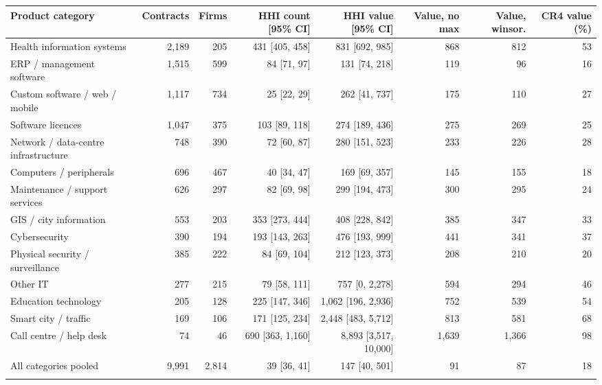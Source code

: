 \begin{tabular}{@{}lrrrrrrr@{}}
\toprule
Product category & Contracts & Firms & HHI count [95\% CI] & HHI value [95\% CI] & Value, no max & Value, winsor. & CR4 value (\%)\\
\midrule
Health information systems & 2,189 & 205 & 431 [405, 458] & 831 [692, 985] & 868 & 812 & 53\\
ERP / management software & 1,515 & 599 & 84 [71, 97] & 131 [74, 218] & 119 & 96 & 16\\
Custom software / web / mobile & 1,117 & 734 & 25 [22, 29] & 262 [41, 737] & 175 & 110 & 27\\
Software licences & 1,047 & 375 & 103 [89, 118] & 274 [189, 436] & 275 & 269 & 25\\
Network / data-centre infrastructure & 748 & 390 & 72 [60, 87] & 280 [151, 523] & 233 & 226 & 28\\
Computers / peripherals & 696 & 467 & 40 [34, 47] & 169 [69, 357] & 145 & 155 & 18\\
Maintenance / support services & 626 & 297 & 82 [69, 98] & 299 [194, 473] & 300 & 295 & 24\\
GIS / city information & 553 & 203 & 353 [273, 444] & 408 [228, 842] & 385 & 347 & 33\\
Cybersecurity & 390 & 194 & 193 [143, 263] & 476 [193, 999] & 441 & 341 & 37\\
Physical security / surveillance & 385 & 222 & 84 [69, 104] & 212 [123, 373] & 208 & 210 & 20\\
Other IT & 277 & 215 & 79 [58, 111] & 757 [0, 2,278] & 594 & 294 & 46\\
Education technology & 205 & 128 & 225 [147, 346] & 1,062 [196, 2,936] & 752 & 539 & 54\\
Smart city / traffic & 169 & 106 & 171 [125, 234] & 2,448 [483, 5,712] & 813 & 581 & 68\\
Call centre / help desk & 74 & 46 & 690 [363, 1,160] & 8,893 [3,517, 10,000] & 1,639 & 1,366 & 98\\
All categories pooled & 9,991 & 2,814 & 39 [36, 41] & 147 [40, 501] & 91 & 87 & 18\\
\botrule
\end{tabular}